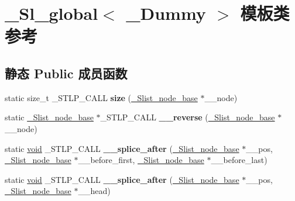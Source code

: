 \hypertarget{class___sl__global}{}\section{\+\_\+\+Sl\+\_\+global$<$ \+\_\+\+Dummy $>$ 模板类 参考}
\label{class___sl__global}
\subsection*{静态 Public 成员函数}
\begin{DoxyCompactItemize}
\item 
\mbox{\label{class___sl__global_a2fac341d5f2b4bcf5a53361d80983f02}} 
static size\+\_\+t \+\_\+\+S\+T\+L\+P\+\_\+\+C\+A\+LL {\bfseries size} (\hyperlink{struct___slist__node__base}{\+\_\+\+Slist\+\_\+node\+\_\+base} $\ast$\+\_\+\+\_\+node)
\item 
\mbox{\label{class___sl__global_ac1575ada318f40b995dbdbb17a2bafde}} 
static \hyperlink{struct___slist__node__base}{\+\_\+\+Slist\+\_\+node\+\_\+base} $\ast$\+\_\+\+S\+T\+L\+P\+\_\+\+C\+A\+LL {\bfseries \+\_\+\+\_\+reverse} (\hyperlink{struct___slist__node__base}{\+\_\+\+Slist\+\_\+node\+\_\+base} $\ast$\+\_\+\+\_\+node)
\item 
\mbox{\label{class___sl__global_abba4b7aae9e9cdccaba8e21c6e66015d}} 
static \hyperlink{interfacevoid}{void} \+\_\+\+S\+T\+L\+P\+\_\+\+C\+A\+LL {\bfseries \+\_\+\+\_\+splice\+\_\+after} (\hyperlink{struct___slist__node__base}{\+\_\+\+Slist\+\_\+node\+\_\+base} $\ast$\+\_\+\+\_\+pos, \hyperlink{struct___slist__node__base}{\+\_\+\+Slist\+\_\+node\+\_\+base} $\ast$\+\_\+\+\_\+before\+\_\+first, \hyperlink{struct___slist__node__base}{\+\_\+\+Slist\+\_\+node\+\_\+base} $\ast$\+\_\+\+\_\+before\+\_\+last)
\item 
\mbox{\label{class___sl__global_ae7523adb49f7c558d81e891dfad7818b}} 
static \hyperlink{interfacevoid}{void} \+\_\+\+S\+T\+L\+P\+\_\+\+C\+A\+LL {\bfseries \+\_\+\+\_\+splice\+\_\+after} (\hyperlink{struct___slist__node__base}{\+\_\+\+Slist\+\_\+node\+\_\+base} $\ast$\+\_\+\+\_\+pos, \hyperlink{struct___slist__node__base}{\+\_\+\+Slist\+\_\+node\+\_\+base} $\ast$\+\_\+\+\_\+head)
\item 
\mbox{\label{class___sl__global_a8156ee241121732fc54765bde7dda2e2}} 

\end{DoxyCompactItemize}
